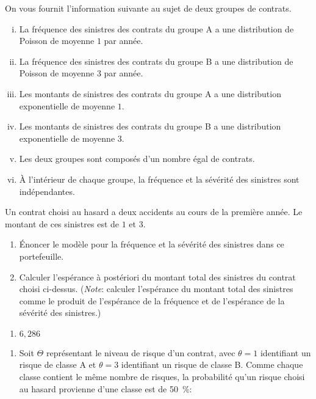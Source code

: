 \begin{exercice}
  On vous fournit l'information suivante au sujet de deux groupes de
  contrats.
  \begin{enumerate}[i)]
  \item La fréquence des sinistres des contrats du groupe A a une
    distribution de Poisson de moyenne $1$ par année.
  \item La fréquence des sinistres des contrats du groupe B a une
    distribution de Poisson de moyenne $3$ par année.
  \item Les montants de sinistres des contrats du groupe A a une
    distribution exponentielle de moyenne $1$.
  \item Les montants de sinistres des contrats du groupe B a une
    distribution exponentielle de moyenne $3$.
  \item Les deux groupes sont composés d'un nombre égal de contrats.
  \item À l'intérieur de chaque groupe, la fréquence et la sévérité
    des sinistres sont indépendantes.
  \end{enumerate}
  Un contrat choisi au hasard a deux accidents au cours de la première
  année. Le montant de ces sinistres est de $1$ et $3$.
  \begin{enumerate}
  \item Énoncer le modèle pour la fréquence et la sévérité des
    sinistres dans ce portefeuille.
  \item Calculer l'espérance à postériori du montant total des
    sinistres du contrat choisi ci-dessus. (\emph{Note}: calculer
    l'espérance du montant total des sinistres comme le produit de
    l'espérance de la fréquence et de l'espérance de la sévérité des
    sinistres.)
  \end{enumerate}
  \begin{rep}
    \begin{enumerate}
    \item $6,286$
    \end{enumerate}
  \end{rep}
  \begin{sol}
    \begin{enumerate}
    \item Soit $\Theta$ représentant le niveau de risque d'un contrat,
      avec $\theta = 1$ identifiant un risque de classe A et $\theta =
      3$ identifiant un risque de classe B. Comme chaque classe
      contient le même nombre de risques, la probabilité qu'un risque
      choisi au hasard provienne d'une classe est de 50~\%:

\end{enumerate}
\end{sol}
\end{exercice}
